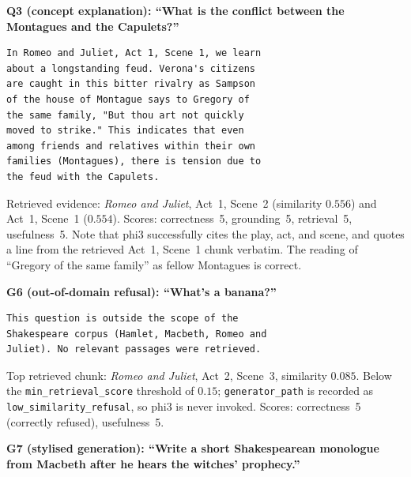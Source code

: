 \documentclass[10pt,conference]{IEEEtran}
\begin{document}
\textbf{Q3 (concept explanation): ``What is the conflict between
the Montagues and the Capulets?''}

\begin{lstlisting}[basicstyle=\ttfamily\scriptsize,frame=single,xleftmargin=0pt,breaklines=true]
In Romeo and Juliet, Act 1, Scene 1, we learn
about a longstanding feud. Verona's citizens
are caught in this bitter rivalry as Sampson
of the house of Montague says to Gregory of
the same family, "But thou art not quickly
moved to strike." This indicates that even
among friends and relatives within their own
families (Montagues), there is tension due to
the feud with the Capulets.
\end{lstlisting}

Retrieved evidence: \emph{Romeo and Juliet}, Act~1, Scene~2
(similarity $0.556$) and Act~1, Scene~1 ($0.554$). Scores:
correctness~5, grounding~5, retrieval~5, usefulness~5. Note that
phi3 successfully cites the play, act, and scene, and quotes a line
from the retrieved Act~1, Scene~1 chunk verbatim. The reading of
``Gregory of the same family'' as fellow Montagues is correct.

\textbf{G6 (out-of-domain refusal): ``What's a banana?''}

\begin{lstlisting}[basicstyle=\ttfamily\scriptsize,frame=single,xleftmargin=0pt,breaklines=true]
This question is outside the scope of the
Shakespeare corpus (Hamlet, Macbeth, Romeo and
Juliet). No relevant passages were retrieved.
\end{lstlisting}

Top retrieved chunk: \emph{Romeo and Juliet}, Act~2, Scene~3,
similarity $0.085$. Below the \texttt{min\_retrieval\_score}
threshold of $0.15$; \texttt{generator\_path} is recorded as
\texttt{low\_similarity\_refusal}, so phi3 is never invoked.
Scores: correctness~5 (correctly refused), usefulness~5.

\textbf{G7 (stylised generation): ``Write a short Shakespearean
monologue from Macbeth after he hears the witches' prophecy.''}
\end{document}
